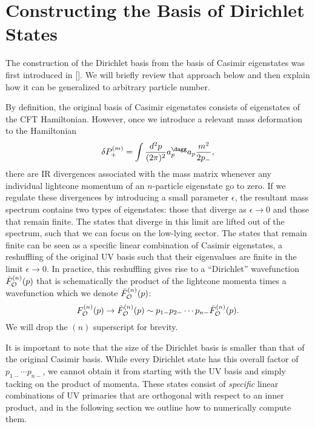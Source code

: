 \appendix

\section{Constructing the Basis of Dirichlet States}
\label{sec:ConstructingBasis}


The construction of the Dirichlet basis from the basis of Casimir eigenstates was first introduced in []. We will briefly review that approach below and then explain how it can be generalized to arbitrary particle number.

By definition, the original basis of Casimir eigenstates consists of eigenstates of the CFT Hamiltonian. However, once we introduce a relevant mass deformation to the Hamiltonian \begin{equation}
	\delta P_+^{(m)} = \int \frac{d^2 p}{(2\pi)^2} a^\dagg_p a_p \frac{m^2}{2 p_-},
\end{equation} there are IR divergences associated with the mass matrix whenever any individual lightcone momentum of an $n$-particle eigenstate go to zero. If we regulate these divergences by introducing a small parameter $\epsilon$, the resultant mass spectrum contains two types of eigenstates: those that diverge as $\epsilon \to 0$ and those that remain finite. The states that diverge in this limit are lifted out of the spectrum, such that we can focus on the low-lying sector. The states that remain finite can be seen as a specific linear combination of Casimir eigenstates, a reshuffling of the original UV basis such that their eigenvalues are finite in the limit $\epsilon \to 0$. In practice, this reshuffling gives rise to a ``Dirichlet'' wavefunction $\tilde{F}_{{\cal O}}^{(n)}(p)$ that is schematically the product of the lightcone momenta times a wavefunction which we denote $\bar{F}_{{\cal O}}^{(n)}(p)$: \begin{equation}
	F_{{\cal O}}^{(n)}(p) \to \tilde{F}_{{\cal O}}^{(n)}(p) \sim p_{1-} p_{2-} \dotsb p_{n-} \bar{F}_{{\cal O}}^{(n)}(p). \label{dirshuffle}
\end{equation} We will drop the $(n)$ superscript for brevity. 

It is important to note that the size of the Dirichlet basis is smaller than that of the original Casimir basis. While every Dirichlet state has this overall factor of $p_{1-} \dotsb p_{n-}$, we cannot obtain it from starting with the UV basis and simply tacking on the product of momenta. These states consist of \textit{specific} linear combinations of UV primaries that are orthogonal with respect to an inner product, and in the following section we outline how to numerically compute them.

